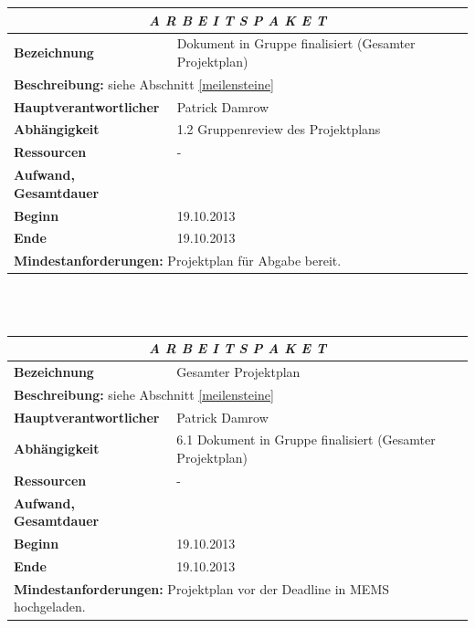\documentclass[fontsize=12pt,paper=a4,twoside]{scrartcl}
\begin{document}
\begin{tabular}{p{7.5cm}|p{7.5cm}}\toprule
\multicolumn{2}{c}{\textbf{\textit{A R B E I T S P A K E T \quad 6.1}}} \\ \toprule \hline
\textbf{Bezeichnung} & Dokument in Gruppe finalisiert (Gesamter Projektplan)\\\hline
\multicolumn{2}{p{15cm}}{\textbf{Beschreibung:} \newline 
siehe Abschnitt \ref{meilensteine} }  \\\hline
\textbf{Hauptverantwortlicher} & Patrick Damrow \\\hline
\textbf{Abhängigkeit} & 1.2 Gruppenreview des Projektplans\\\hline
\textbf{Ressourcen} & -\\\hline
\textbf{Aufwand, Gesamtdauer} & \\\hline
\textbf{Beginn} & 19.10.2013 \\\hline
\textbf{Ende} & 19.10.2013\\\hline
\multicolumn{2}{p{15cm}}{\textbf{Mindestanforderungen: } \newline
Projektplan für Abgabe bereit.}  \\ \toprule
\end{tabular} \\\\

\begin{tabular}{p{7.5cm}|p{7.5cm}}\toprule
\multicolumn{2}{c}{\textbf{\textit{A R B E I T S P A K E T \quad 6.2}}} \\ \toprule \hline
\textbf{Bezeichnung} & Gesamter Projektplan\\\hline
\multicolumn{2}{p{15cm}}{\textbf{Beschreibung:} \newline 
siehe Abschnitt \ref{meilensteine} }  \\\hline
\textbf{Hauptverantwortlicher} & Patrick Damrow \\\hline
\textbf{Abhängigkeit} & 6.1 Dokument in Gruppe finalisiert (Gesamter Projektplan)\\\hline
\textbf{Ressourcen} & -\\\hline
\textbf{Aufwand, Gesamtdauer} & \\\hline
\textbf{Beginn} & 19.10.2013 \\\hline
\textbf{Ende} & 19.10.2013\\\hline
\multicolumn{2}{p{15cm}}{\textbf{Mindestanforderungen: } \newline
Projektplan vor der Deadline in MEMS hochgeladen.}  \\ \toprule
\end{tabular} \\\\
\end{document}
